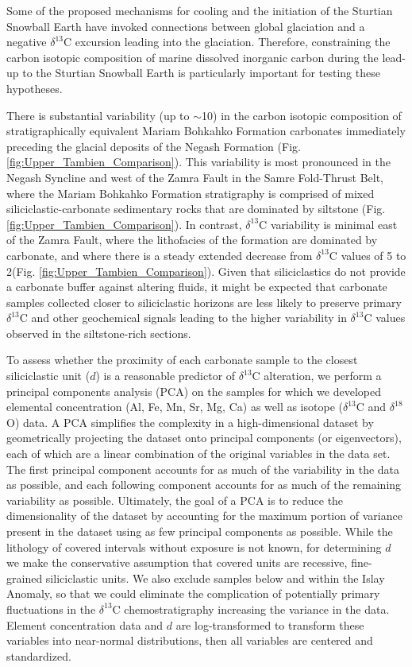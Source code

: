 \documentclass[11pt,letterpaper]{article}
\newcommand{\dC}{$\delta^{13}$C\xspace}
\newcommand{\dO}{$\delta^{18}$O\xspace}
\newcommand{\permil}{\textperthousand\xspace}
\newcommand{\dsil}{$d$\xspace}
\begin{document}
Some of the proposed mechanisms for cooling and the initiation of the Sturtian Snowball Earth have invoked connections between global glaciation and a negative \dC excursion leading into the glaciation. Therefore, constraining the carbon isotopic composition of marine dissolved inorganic carbon during the lead-up to the Sturtian Snowball Earth is particularly important for testing these hypotheses.

There is substantial variability (up to $\sim$10\permil) in the carbon isotopic composition of stratigraphically equivalent Mariam Bohkahko Formation carbonates immediately preceding the glacial deposits of the Negash Formation (Fig. \ref{fig:Upper_Tambien_Comparison}). This variability is most pronounced in the Negash Syncline and west of the Zamra Fault in the Samre Fold-Thrust Belt, where the Mariam Bohkahko Formation stratigraphy is comprised of mixed siliciclastic-carbonate sedimentary rocks that are dominated by siltstone (Fig. \ref{fig:Upper_Tambien_Comparison}). In contrast, \dC variability is minimal east of the Zamra Fault, where the lithofacies of the formation are dominated by carbonate, and where there is a steady extended decrease from \dC values of 5 to 2\permil (Fig. \ref{fig:Upper_Tambien_Comparison}). Given that siliciclastics do not provide a carbonate buffer against altering fluids, it might be expected that carbonate samples collected closer to siliciclastic horizons are less likely to preserve primary \dC and other geochemical signals leading to the higher variability in \dC values observed in the siltstone-rich sections.

To assess whether the proximity of each carbonate sample to the closest siliciclastic unit (\dsil) is a reasonable predictor of \dC alteration, we perform a principal components analysis (PCA) on the samples for which we developed elemental concentration (Al, Fe, Mn, Sr, Mg, Ca) as well as isotope (\dC and \dO) data. A PCA simplifies the complexity in a high-dimensional dataset by geometrically projecting the dataset onto principal components (or eigenvectors), each of which are a linear combination of the original variables in the data set. The first principal component accounts for as much of the variability in the data as possible, and each following component accounts for as much of the remaining variability as possible. Ultimately, the goal of a PCA is to reduce the dimensionality of the dataset by accounting for the maximum portion of variance present in the dataset using as few principal components as possible. While the lithology of covered intervals without exposure is not known, for determining \dsil we make the conservative assumption that covered units are recessive, fine-grained siliciclastic units. We also exclude samples below and within the Islay Anomaly, so that we could eliminate the complication of potentially primary fluctuations in the \dC chemostratigraphy increasing the variance in the data. Element concentration data and \dsil are log-transformed to transform these variables into near-normal distributions, then all variables are centered and standardized.
\end{document}
